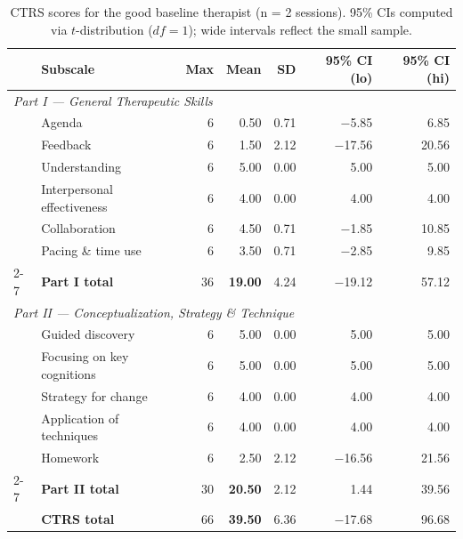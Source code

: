 \begin{table}[ht]
\centering
\caption{CTRS scores for the good baseline therapist (n = 2 sessions). 95\% CIs computed via $t$-distribution ($df = 1$); wide intervals reflect the small sample.}
\label{tab:ctrs_good_baseline}
\begin{tabular}{llrrrrr}
\toprule
 & \textbf{Subscale} & \textbf{Max} & \textbf{Mean} & \textbf{SD} & \textbf{95\% CI (lo)} & \textbf{95\% CI (hi)} \\
\midrule
\multicolumn{7}{l}{\textit{Part I — General Therapeutic Skills}} \\
\midrule
 & Agenda                      & 6 & 0.50 & 0.71 & $-$5.85 & 6.85 \\
 & Feedback                    & 6 & 1.50 & 2.12 & $-$17.56 & 20.56 \\
 & Understanding               & 6 & 5.00 & 0.00 & 5.00 & 5.00 \\
 & Interpersonal effectiveness & 6 & 4.00 & 0.00 & 4.00 & 4.00 \\
 & Collaboration               & 6 & 4.50 & 0.71 & $-$1.85 & 10.85 \\
 & Pacing \& time use          & 6 & 3.50 & 0.71 & $-$2.85 & 9.85 \\
\cmidrule{2-7}
 & \textbf{Part I total}       & 36 & \textbf{19.00} & 4.24 & $-$19.12 & 57.12 \\
\midrule
\multicolumn{7}{l}{\textit{Part II — Conceptualization, Strategy \& Technique}} \\
\midrule
 & Guided discovery            & 6 & 5.00 & 0.00 & 5.00 & 5.00 \\
 & Focusing on key cognitions  & 6 & 5.00 & 0.00 & 5.00 & 5.00 \\
 & Strategy for change         & 6 & 4.00 & 0.00 & 4.00 & 4.00 \\
 & Application of techniques   & 6 & 4.00 & 0.00 & 4.00 & 4.00 \\
 & Homework                    & 6 & 2.50 & 2.12 & $-$16.56 & 21.56 \\
\cmidrule{2-7}
 & \textbf{Part II total}      & 30 & \textbf{20.50} & 2.12 & 1.44 & 39.56 \\
\midrule
 & \textbf{CTRS total}         & 66 & \textbf{39.50} & 6.36 & $-$17.68 & 96.68 \\
\bottomrule
\end{tabular}
\end{table}
